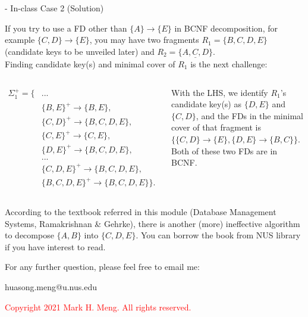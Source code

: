 \begin{frame}[fragile]{ - In-class Case 2 (Solution)}
	
	If you try to use a FD other than $\{A\}  \rightarrow \{E\}$ in BCNF decomposition, for example $\{C,D\}\rightarrow\{E\}$, you may have two fragments $R_1=\{B,C,D,E\}$ (candidate keys to be unveiled later) and $R_2=\{\underline{A,C,D}\}$. \\\vspace{2pt}
	Finding candidate key(s) and minimal cover of $R_1$ is the next challenge:\\\vspace{-3pt}
	\begin{columns}
		\begin{scriptsize}\begin{align*} 
				\Sigma_{1}^{+} = \{ & ...\\
				&\{B,E\}^{+} \rightarrow \{B,E\},\\
				&\{C,D\}^{+} \rightarrow \{B,C,D,E\},\\
				&\{C,E\}^{+} \rightarrow \{C,E\},\\
				&\{D,E\}^{+} \rightarrow \{B,C,D,E\},\\
				& ...\\
				&\{C,D,E\}^{+} \rightarrow \{B,C,D,E\},\\
				&\{B,C,D,E\}^{+} \rightarrow \{B,C,D,E\}\}.
		\end{align*}\end{scriptsize} 
		With the LHS, we identify $R_1$'s candidate key(s) as $\{D,E\}$ and $\{C,D\}$, and the FDs in the minimal cover of that fragment is $\{\{C,D\}\rightarrow\{E\}, \{D,E\}\rightarrow\{B,C\}\}$. \\\vspace{2pt}
		Both of these two FDs are in BCNF.
	\end{columns}\vspace{-16pt}
	\begin{block}{}
	{\scriptsize According to the textbook referred in this module (Database Management Systems, Ramakrishnan \& Gehrke), there is another (more) ineffective algorithm to decompose $\{A,B\}$ into $\{C,D,E\}$. You can borrow the book from NUS library if you have interest to read.}
	\end{block}
	
\end{frame}

\begin{frame}{}
	\centering  
	For any further question, please feel free to email me:\vspace{10pt}
	
	huasong.meng@u.nus.edu\\\vspace{3pt}
	
	\begin{tcolorbox}
		\begin{center}
			\textcolor{red}{Copyright 2021 Mark H. Meng. All rights reserved.}
		\end{center}
	\end{tcolorbox}
\end{frame}